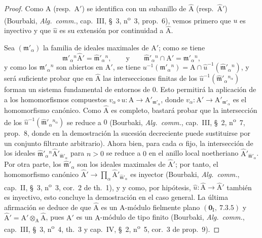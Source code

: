 \begin{proof}
Como $\mathrm{A}$ (resp.\ $\mathrm{A}'$) se identifica con un subanillo de $\hat{\mathrm{A}}$ (resp.\ $\hat{\mathrm{A}}'$) (Bourbaki,
\emph{Alg.\ comm.}, cap.~III, \S~3, n\textsuperscript{o}~3, prop.~6), vemos primero que $u$ es inyectivo
y que $\hat{u}$ es su extensión por continuidad a $\hat{\mathrm{A}}$.

Sea $(\mathfrak{m}'_\alpha)$ la familia de ideales maximales de $\mathrm{A}'$; como se tiene
\[
\mathfrak{m}'_\alpha{}^n\hat{\mathrm{A}}'=\hat{\mathfrak{m}}'_\alpha{}^n, \qquad \text{y} \qquad \hat{\mathfrak{m}}'_\alpha{}^n\cap\mathrm{A}'=\mathfrak{m}'_\alpha{}^n,
\]
y como los $\mathfrak{m}'_\alpha{}^n$ son abiertos en $\mathrm{A}'$, se tiene
$u^{-1}(\mathfrak{m}'_\alpha{}^n)=\mathrm{A}\cap\hat{u}^{-1}(\hat{\mathfrak{m}}'_\alpha{}^n)$, y será suficiente probar que en
$\hat{\mathrm{A}}$ las intersecciones finitas de los $\hat{u}^{-1}(\hat{\mathfrak{m}}'_\alpha{}^{n_\alpha})$ forman un sistema fundamental de entornos
de $0$. Esto permitirá la aplicación de  a los homomorfismos compuestos
$v_\alpha\circ u:\mathrm{A}\to\mathrm{A}'_{\mathfrak{m}'_\alpha}$, donde
$v_\alpha:\mathrm{A}'\to\mathrm{A}'_{\mathfrak{m}'_\alpha}$ es el homomorfismo canónico. Como $\hat{\mathrm{A}}$ es completo, bastará
probar que la intersección de los $\hat{u}^{-1}(\hat{\mathfrak{m}}'_\alpha{}^{n_\alpha})$ se reduce a $0$ (Bourbaki,
\emph{Alg.\ comm.}, cap.~III, \S~2, n\textsuperscript{o}~7, prop.~8, donde en la demostración la sucesión decreciente puede sustituirse por un conjunto
filtrante arbitrario). Ahora bien, para cada $\alpha$
fijo, la intersección de los ideales $\hat{\mathfrak{m}}'_\alpha{}^n\hat{\mathrm{A}}'_{\hat{\mathfrak{m}}'_\alpha}$ para $n>0$ se reduce a $0$ en el
anillo local noetheriano $\hat{\mathrm{A}}'_{\hat{\mathfrak{m}}'_\alpha}$.
Por otra parte, los $\hat{\mathfrak{m}}'_\alpha$ son los ideales maximales de $\hat{\mathrm{A}}'$; por tanto, el homomorfismo canónico
$\hat{\mathrm{A}}'\to\prod_\alpha\hat{\mathrm{A}}'_{\hat{\mathfrak{m}}'_\alpha}$ es inyector (Bourbaki, \emph{Alg.\ comm.}, cap.~II, \S~3, n\textsuperscript{o}~3, cor.~2 de th.~1), y
y como, por hipótesis, $\hat{u}:\hat{\mathrm{A}}\to\hat{\mathrm{A}}'$ también es inyectivo, esto concluye la demostración en
el caso general. La última afirmación se deduce de que $\hat{\mathrm{A}}$ es un $\mathrm{A}$-módulo fielmente
plano $(\mathbf{0}_\mathrm{I},~7.3.5)$ y $\hat{\mathrm{A}}'=\mathrm{A}'\otimes_\mathrm{A}\hat{\mathrm{A}}$, pues $\mathrm{A}'$ es un $\mathrm{A}$-módulo de tipo finito
(Bourbaki, \emph{Alg.\ comm.}, cap.~III, \S~3, n\textsuperscript{o}~4, th.~3 y cap.~IV, \S~2, n\textsuperscript{o}~5, cor.~3 de prop.~9).
\end{proof}

